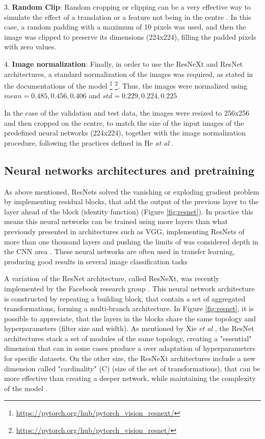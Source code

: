 \documentclass[11pt,onecolumn,titlepage,letterpaper]{article}
\begin{document}
3. \textbf{Random Clip}: Random cropping or clipping can be a very effective way to simulate the effect of a translation or a feature not being in the centre \cite{Shorten2019}. In this case, a random padding with a maximum of 10 pixels was used, and then the image was clipped to preserve its dimensions (224x224), filling the padded pixels with zero values.

4. \textbf{Image normalization}: Finally, in order to use the ResNeXt and ResNet architectures, a standard normalization  of the images was required, as stated in the documentations of the model \footnote{\url{https://pytorch.org/hub/pytorch_vision_resnext/}} \footnote{\url{https://pytorch.org/hub/pytorch_vision_resnet/}}. Thus, the images were normalized using $mean = {0.485, 0.456, 0.406}$ and $std = {0.229, 0.224, 0.225}$ 

In the case of the validation and test data, the images were resized to 256x256 and then cropped on the centre, to match the size of the input images of the predefined neural networks (224x224), together with the image normalization procedure, following the practices defined in He \textit{at al}  \cite{He2016}.

\subsection{Neural networks architectures and pretraining}

As above mentioned, ResNets solved the vanishing or exploding gradient problem by implementing residual blocks, that add the output of the previous layer to the layer ahead of the block (identity function) (Figure \ref{fig:resnet}). In practice this means this neural networks can be trained using more layers than what previously presented in architectures such as VGG, implementing ResNets of more than one thousand layers and pushing the limits of was considered depth in the CNN area \cite{He2016,He2016a}. These neural networks are often used in transfer learning, producing good results in several image classification tasks \cite{Huh2016}

A variation of the ResNet architecture, called ResNeXt, was recently implemented by the Facebook research group \cite{Xie2017}. This neural network architecture is constructed by repeating a building block, that contain a set of aggregated transformations, forming a multi-branch architecture. In Figure \ref{fig:resnet}, it is possible to appreciate, that the layers in the blocks share the same topology and hyperparameters (filter size and width). As mentioned by Xie \textit{et al} \cite{Xie2017}, the ResNet architectures stack a set of modules of the same topology, creating a "essential" dimension that can in some cases produce a over adaptation of hyperparameters for specific datasets. On the other size, the ResNeXt architectures include a new dimension called "cardinality" (C) (size of the set of transformations), that can be more effective than creating a deeper network, while maintaining the complexity of the model \cite{Xie2017}.
\end{document}
